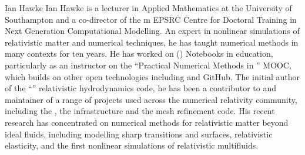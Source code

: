 \begin{participant}[PM=2,type=PI,gender=male]{Ian Hawke}
%
Ian Hawke is a lecturer in Applied Mathematics at the University of
Southampton and a co-director of the m EPSRC Centre for Doctoral
Training in Next Generation Computational Modelling. An expert in
nonlinear simulations of relativistic matter and numerical techniques,
he has taught numerical methods in many contexts for ten years. He has
worked on \IPython (\Jupyter{}) Notebooks in education, particularly as an
instructor on the ``Practical Numerical Methods in \Python'' MOOC,
which builds on other open technologies including  and GitHub. The
initial author of the ``'' relativistic hydrodynamics code, he has
been a contributor to and maintainer of a range of projects used
across the numerical relativity community, including the 
, the  infrastructure and 
the  mesh refinement
code. His recent research has concentrated on numerical methods for
relativistic matter beyond ideal fluids, including modelling sharp
transitions and surfaces, relativistic elasticity, and the first
nonlinear simulations of relativistic multifluids.
%
\end{participant}


